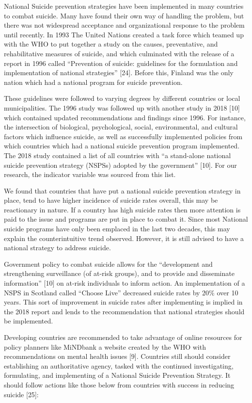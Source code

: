\documentclass[]{article}
\begin{document}
National Suicide prevention strategies have been implemented in many
countries to combat suicide. Many have found their own way of handling
the problem, but there was not widespread acceptance and organizational
response to the problem until recently. In 1993 The United Nations
created a task force which teamed up with the WHO to put together a
study on the causes, preventative, and rehabilitative measures of
suicide, and which culminated with the release of a report in 1996
called ``Prevention of suicide: guidelines for the formulation and
implementation of national strategies'' {[}24{]}. Before this, Finland
was the only nation which had a national program for suicide prevention.

These guidelines were followed to varying degrees by different countries
or local municipalities. The 1996 study was followed up with another
study in 2018 {[}10{]} which contained updated recommendations and
findings since 1996. For instance, the intersection of biological,
psychological, social, environmental, and cultural factors which
influence suicide, as well as successfully implemented policies from
which countries which had a national suicide prevention program
implemented. The 2018 study contained a list of all countries with ``a
stand-alone national suicide prevention strategy (NSPSs) adopted by the
government'' {[}10{]}. For our research, the indicator variable was
sourced from this list.

We found that countries that have put a national suicide prevention
strategy in place, tend to have higher incidence of suicide rates
overall, this may be reactionary in nature. If a country has high
suicide rates then more attention is paid to the issue and programs are
put in place to combat it. Since most National suicide programs have
only been emplaced in the last two decades, this may explain the
counterintuitive trend observed. However, it is still advised to have a
national strategy to address suicide.

Government policy to combat suicide allows for the ``development and
strengthening surveillance (of at-risk groups), and to provide and
disseminate information'' {[}10{]} on at-risk individuals to inform
action. An implementation of a NSPS in Scotland called ``Choose Live''
decreased suicide rates by 20\% over 10 years. This sort of improvement
in suicide rates after implementing is implied in the 2018 report and
lends to the recommendation that national strategies should be
implemented.

Developing countries are recommended to take advantage of online
resources for policy planners like MiNDbank a website created by the WHO
with recommendations on mental health issues {[}9{]}. Countries still
should consider establishing an authoritative agency, tasked with the
continued investigating, formulating, and implementing of a National
Suicide Prevention Strategy. It should follow actions like those below
from countries with success in reducing suicide {[}25{]}:
\end{document}
